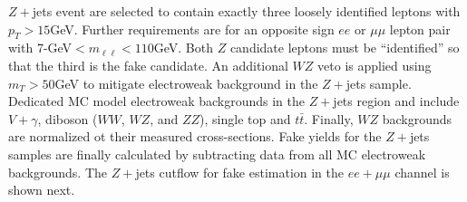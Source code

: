\begin{table}[tb]
\caption{Requirements for ``identified'' and ``anti-identified'' electrons and muons.}
\label{tab:idantiid}
\end{table}
$Z+$jets event are selected to contain exactly three loosely identified leptons with $p_T>15$GeV. Further requirements are for an opposite sign $ee$ or $\mu\mu$ lepton pair with 7-GeV$< m_{\ell\ell} < 110$GeV. Both $Z$ candidate leptons must be ``identified'' so that the third is the fake candidate. An additional $WZ$ veto is applied using $m_T>50$GeV to mitigate electroweak background in the $Z+$jets sample. Dedicated MC model electroweak backgrounds in the $Z+$jets region and include $V+\gamma$, diboson ($WW$, $WZ$, and $ZZ$), single top and $t\bar{t}$. Finally, $WZ$ backgrounds are normalized ot their measured cross-sections. Fake yields for the $Z+$jets samples are finally calculated by subtracting data from all MC electroweak backgrounds. The $Z+$jets cutflow for fake estimation in the $ee+\mu\mu$ channel is shown next. 

